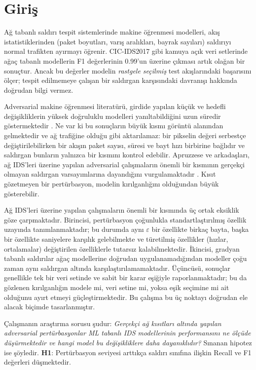\documentclass[conference]{IEEEtran}
\begin{document}
\section{Giriş}

Ağ tabanlı saldırı tespit sistemlerinde makine öğrenmesi modelleri, akış istatistiklerinden (paket boyutları, varış aralıkları, bayrak sayıları) saldırıyı normal trafikten ayırmayı öğrenir. CIC-IDS2017 gibi kamuya açık veri setlerinde ağaç tabanlı modellerin F1 değerlerinin 0.99'un üzerine çıkması artık olağan bir sonuçtur. Ancak bu değerler modelin \emph{rastgele seçilmiş} test akışlarındaki başarısını ölçer; tespit edilmemeye çalışan bir saldırgan karşısındaki davranışı hakkında doğrudan bilgi vermez.

Adversarial makine öğrenmesi literatürü, girdide yapılan küçük ve hedefli değişikliklerin yüksek doğruluklu modelleri yanıltabildiğini uzun süredir göstermektedir \cite{szegedy2014,goodfellow2015,biggio2013}. Ne var ki bu sonuçların büyük kısmı görüntü alanından gelmektedir ve ağ trafiğine olduğu gibi aktarılamaz: bir pikselin değeri serbestçe değiştirilebilirken bir akışın paket sayısı, süresi ve bayt hızı birbirine bağlıdır ve saldırgan bunların yalnızca bir kısmını kontrol edebilir. Apruzzese ve arkadaşları, ağ IDS'leri üzerine yapılan adversarial çalışmaların önemli bir kısmının gerçekçi olmayan saldırgan varsayımlarına dayandığını vurgulamaktadır \cite{apruzzese2022}. Kısıt gözetmeyen bir pertürbasyon, modelin kırılganlığını olduğundan büyük gösterebilir.

Ağ IDS'leri üzerine yapılan çalışmaların önemli bir kısmında üç ortak eksiklik göze çarpmaktadır. Birincisi, pertürbasyon çoğunlukla standartlaştırılmış özellik uzayında tanımlanmaktadır; bu durumda aynı $\varepsilon$ bir özellikte birkaç bayta, başka bir özellikte saniyelere karşılık gelebilmekte ve türetilmiş özellikler (hızlar, ortalamalar) değiştirilen özelliklerle tutarsız kalabilmektedir. İkincisi, gradyan tabanlı saldırılar ağaç modellerine doğrudan uygulanamadığından modeller çoğu zaman aynı saldırgan altında karşılaştırılamamaktadır. Üçüncüsü, sonuçlar genellikle tek bir veri setinde ve sabit bir karar eşiğiyle raporlanmaktadır; bu da gözlenen kırılganlığın modele mi, veri setine mi, yoksa eşik seçimine mi ait olduğunu ayırt etmeyi güçleştirmektedir. Bu çalışma bu üç noktayı doğrudan ele alacak biçimde tasarlanmıştır.

Çalışmanın araştırma sorusu şudur: \emph{Gerçekçi ağ kısıtları altında yapılan adversarial pertürbasyonlar ML tabanlı IDS modellerinin performansını ne ölçüde düşürmektedir ve hangi model bu değişikliklere daha dayanıklıdır?} Sınanan hipotez ise şöyledir. \textbf{H1}: Pertürbasyon seviyesi arttıkça saldırı sınıfına ilişkin Recall ve F1 değerleri düşmektedir.
\end{document}
